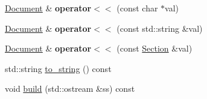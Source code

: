 \begin{DoxyCompactItemize}
\item 
\hypertarget{classlatex_1_1doc_1_1Document_a26f3060583bc89e9d355303791e24c3e}{\hyperlink{classlatex_1_1doc_1_1Document}{Document} \& {\bfseries operator$<$$<$} (const char $\ast$val)}\label{classlatex_1_1doc_1_1Document_a26f3060583bc89e9d355303791e24c3e}

\item 
\hypertarget{classlatex_1_1doc_1_1Document_acbd6b2f75fcfb5159a18f9bedec3c7d2}{\hyperlink{classlatex_1_1doc_1_1Document}{Document} \& {\bfseries operator$<$$<$} (const std\-::string \&val)}\label{classlatex_1_1doc_1_1Document_acbd6b2f75fcfb5159a18f9bedec3c7d2}

\item 
\hypertarget{classlatex_1_1doc_1_1Document_a625790b100f4288bb2afcf622c758a12}{\hyperlink{classlatex_1_1doc_1_1Document}{Document} \& {\bfseries operator$<$$<$} (const \hyperlink{classlatex_1_1doc_1_1Section}{Section} \&val)}\label{classlatex_1_1doc_1_1Document_a625790b100f4288bb2afcf622c758a12}

\item 
std\-::string \hyperlink{classlatex_1_1doc_1_1Document_a641c1e1c79230d94b0157deb7d3a1439}{to\-\_\-string} () const 
\item 
void \hyperlink{classlatex_1_1doc_1_1Document_a6f74931b2be2c15bcc8f1bcef982a3b1}{build} (std\-::ostream \&ss) const 
\end{DoxyCompactItemize}

